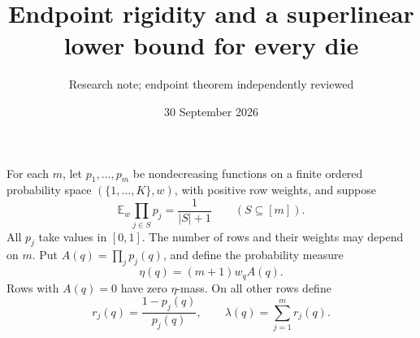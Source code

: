 \documentclass[11pt]{article}
\title{Endpoint rigidity and a superlinear lower bound for every die}
\author{Research note; endpoint theorem independently reviewed}
\date{30 September 2026}
\newcommand{\E}{\mathbb E}
\begin{document}
\maketitle
For each $m$, let $p_1,\ldots,p_m$ be nondecreasing functions on a
finite ordered probability space $(\{1,\ldots,K\},w)$, with positive
row weights, and suppose
\begin{equation}\label{mixed}
 \E_w\prod_{j\in S}p_j=\frac1{|S|+1}
 \qquad(S\subseteq[m]).
\end{equation}
All $p_j$ take values in $[0,1]$. The number of rows and their weights
may depend on $m$. Put $A(q)=\prod_jp_j(q)$, and define the probability
measure
\[
 \eta(q)=(m+1)w_q A(q).
\]
Rows with $A(q)=0$ have zero $\eta$-mass. On all other rows define
\[
 r_j(q)=\frac{1-p_j(q)}{p_j(q)},\qquad
 \lambda(q)=\sum_{j=1}^m r_j(q).
\]
\end{document}
